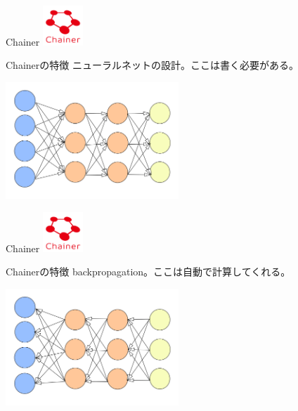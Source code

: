 \documentclass[12pt, unicode]{beamer}
\begin{document}
\begin{frame}{Chainer}
\includegraphics[clip,width=1.5cm]{image/chainer_logo.png}
\begin{block}{Chainerの特徴}
ニューラルネットの設計。ここは書く必要がある。
\end{block}
\includegraphics[clip,width=6.5cm]{image/neural_net.png}
\end{frame}

\begin{frame}{Chainer}
\includegraphics[clip,width=1.5cm]{image/chainer_logo.png}
\begin{block}{Chainerの特徴}
backpropagation。ここは自動で計算してくれる。
\end{block}
\includegraphics[clip,width=6.5cm]{image/backpropagation.png}
\end{frame}
\end{document}

